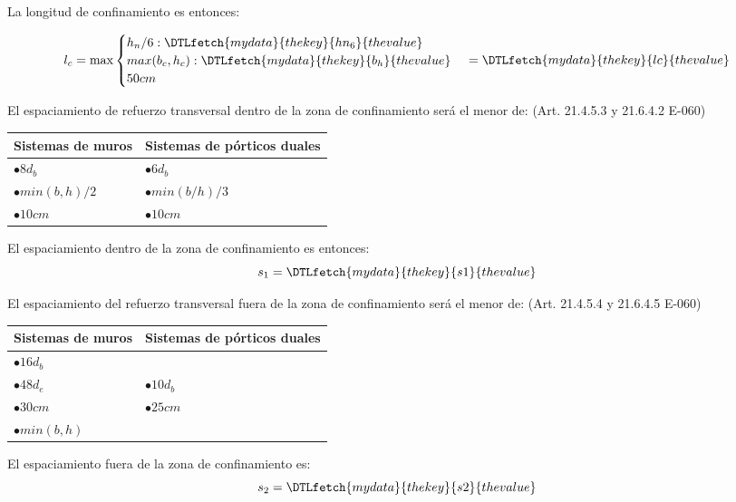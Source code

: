 \documentclass[12pt]{article}
\newcommand{\var}[1]{\DTLfetch{mydata}{thekey}{#1}{thevalue}}
\begin{document}
        La longitud de confinamiento es entonces:

        \[l_c = \max \begin{cases} h_n/6 : \var{hn_6} \\ max(b_c,h_c) : \var{b_h} \\ 50 cm \end{cases}  = \var{lc}\\\]

        El espaciamiento de refuerzo transversal dentro de la zona de confinamiento será el menor de: (Art. 21.4.5.3 y 21.6.4.2 E-060)

        \begin{center}
            \begin{tabular}{ll}
                \hline
                Sistemas de muros & Sistemas de pórticos duales \\
                \hline
                $\bullet 8d_b$ & $\bullet 6d_b$ \\
                $\bullet min(b,h)/2$ & $\bullet min(b/h)/3$ \\
                $\bullet 10 cm$ & $\bullet 10 cm$ \\
                \hline
            \end{tabular}
        \end{center}
        
        El espaciamiento dentro de la zona de confinamiento es entonces:
        \[ s_1 =  \var{s1} \]

        \newpage
        El espaciamiento del refuerzo transversal fuera de la zona de confinamiento será el menor de: (Art. 21.4.5.4 y 21.6.4.5 E-060)

       \begin{center}
            \begin{tabular}{ll}
                \hline
                Sistemas de muros & Sistemas de pórticos duales \\
                \hline
                $\bullet 16d_b$ &  \\
                $\bullet 48d_e$ & $\bullet 10d_b$ \\
                $\bullet 30 cm$ & $\bullet 25 cm$ \\
                $\bullet min(b,h)$  \\
                \hline
            \end{tabular}
        \end{center}

        El espaciamiento fuera de la zona de confinamiento es:
        \[ s_2 =  \var{s2} \]
\end{document}
